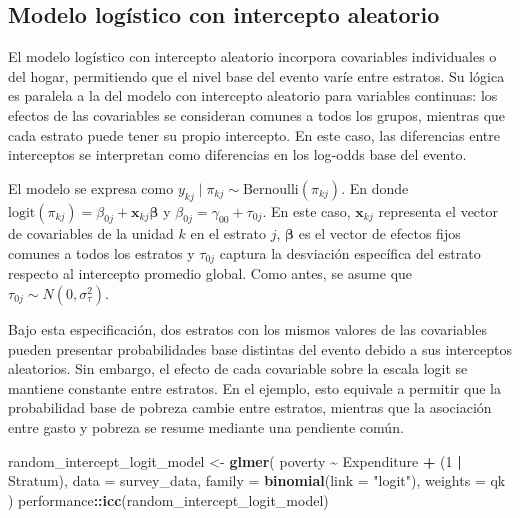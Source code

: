 \documentclass[
  spanish,
  12pt,
]{book}
\newenvironment{Shaded}{\begin{snugshade}}{\end{snugshade}}
\newcommand{\AttributeTok}[1]{\textcolor[rgb]{0.13,0.29,0.53}{#1}}
\newcommand{\DecValTok}[1]{\textcolor[rgb]{0.00,0.00,0.81}{#1}}
\newcommand{\FunctionTok}[1]{\textcolor[rgb]{0.13,0.29,0.53}{\textbf{#1}}}
\newcommand{\NormalTok}[1]{#1}
\newcommand{\OtherTok}[1]{\textcolor[rgb]{0.56,0.35,0.01}{#1}}
\newcommand{\SpecialCharTok}[1]{\textcolor[rgb]{0.81,0.36,0.00}{\textbf{#1}}}
\newcommand{\StringTok}[1]{\textcolor[rgb]{0.31,0.60,0.02}{#1}}
\begin{document}
\subsection{Modelo logístico con intercepto aleatorio}\label{modelo-logistico-con-intercepto-aleatorio}

El modelo logístico con intercepto aleatorio incorpora covariables individuales o del hogar, permitiendo que el nivel base del evento varíe entre estratos. Su lógica es paralela a la del modelo con intercepto aleatorio para variables continuas: los efectos de las covariables se consideran comunes a todos los grupos, mientras que cada estrato puede tener su propio intercepto. En este caso, las diferencias entre interceptos se interpretan como diferencias en los log-odds base del evento.

El modelo se expresa como \(y_{kj} \mid \pi_{kj} \sim \text{Bernoulli}(\pi_{kj})\). En donde \(\text{logit}(\pi_{kj}) = \beta_{0j} + \mathbf{x}_{kj}\boldsymbol{\beta}\) y \(\beta_{0j} = \gamma_{00} + \tau_{0j}\). En este caso, \(\mathbf{x}_{kj}\) representa el vector de covariables de la unidad \(k\) en el estrato \(j\), \(\boldsymbol{\beta}\) es el vector de efectos fijos comunes a todos los estratos y \(\tau_{0j}\) captura la desviación específica del estrato respecto al intercepto promedio global. Como antes, se asume que \(\tau_{0j} \sim N(0,\sigma_{\tau}^{2})\).

Bajo esta especificación, dos estratos con los mismos valores de las covariables pueden presentar probabilidades base distintas del evento debido a sus interceptos aleatorios. Sin embargo, el efecto de cada covariable sobre la escala logit se mantiene constante entre estratos. En el ejemplo, esto equivale a permitir que la probabilidad base de pobreza cambie entre estratos, mientras que la asociación entre gasto y pobreza se resume mediante una pendiente común.

\begin{Shaded}
\begin{Highlighting}[]
\NormalTok{random\_intercept\_logit\_model }\OtherTok{\textless{}{-}} \FunctionTok{glmer}\NormalTok{(}
\NormalTok{  poverty }\SpecialCharTok{\textasciitilde{}}\NormalTok{ Expenditure }\SpecialCharTok{+}\NormalTok{ (}\DecValTok{1} \SpecialCharTok{|}\NormalTok{ Stratum),}
  \AttributeTok{data =}\NormalTok{ survey\_data,}
  \AttributeTok{family =} \FunctionTok{binomial}\NormalTok{(}\AttributeTok{link =} \StringTok{"logit"}\NormalTok{),}
  \AttributeTok{weights =}\NormalTok{ qk}
\NormalTok{)}
\NormalTok{performance}\SpecialCharTok{::}\FunctionTok{icc}\NormalTok{(random\_intercept\_logit\_model)}
\end{Highlighting}
\end{Shaded}
\end{document}
